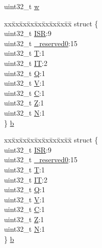 \begin{DoxyCompactItemize}
\begin{tabbing}
\end{tabbing}\item 
uint32\+\_\+t \hyperlink{unionx_p_s_r___type_ad0fb62e7a08e70fc5e0a76b67809f84b}{w}
\item 
\begin{tabbing}
xx\=xx\=xx\=xx\=xx\=xx\=xx\=xx\=xx\=\kill
struct \{\\
\>uint32\_t \hyperlink{unionx_p_s_r___type_ad502ba7dbb2aab5f87c782b28f02622d}{ISR}:9\\
\>uint32\_t \hyperlink{unionx_p_s_r___type_ac8a6a13838a897c8d0b8bc991bbaf7c1}{\_reserved0}:15\\
\>uint32\_t \hyperlink{unionx_p_s_r___type_a6e1cf12e53a20224f6f62c001d9be972}{T}:1\\
\>uint32\_t \hyperlink{unionx_p_s_r___type_a76485660fe8ad98cdc71ddd7cb0ed777}{IT}:2\\
\>uint32\_t \hyperlink{unionx_p_s_r___type_a65f27ddc4f7e09c14ce7c5211b2e000a}{Q}:1\\
\>uint32\_t \hyperlink{unionx_p_s_r___type_acd4a2b64faee91e4a9eef300667fa222}{V}:1\\
\>uint32\_t \hyperlink{unionx_p_s_r___type_a7a1caf92f32fe9ebd8d1fe89b06c7776}{C}:1\\
\>uint32\_t \hyperlink{unionx_p_s_r___type_a5ae954cbd9986cd64625d7fa00943c8e}{Z}:1\\
\>uint32\_t \hyperlink{unionx_p_s_r___type_abae0610bc2a97bbf7f689e953e0b451f}{N}:1\\
\} \hyperlink{unionx_p_s_r___type_a5fe7b3d4251f5516a5cc744f416a600a}{b}\\

\end{tabbing}\item 
\begin{tabbing}
xx\=xx\=xx\=xx\=xx\=xx\=xx\=xx\=xx\=\kill
struct \{\\
\>uint32\_t \hyperlink{unionx_p_s_r___type_ad502ba7dbb2aab5f87c782b28f02622d}{ISR}:9\\
\>uint32\_t \hyperlink{unionx_p_s_r___type_ac8a6a13838a897c8d0b8bc991bbaf7c1}{\_reserved0}:15\\
\>uint32\_t \hyperlink{unionx_p_s_r___type_a6e1cf12e53a20224f6f62c001d9be972}{T}:1\\
\>uint32\_t \hyperlink{unionx_p_s_r___type_a76485660fe8ad98cdc71ddd7cb0ed777}{IT}:2\\
\>uint32\_t \hyperlink{unionx_p_s_r___type_a65f27ddc4f7e09c14ce7c5211b2e000a}{Q}:1\\
\>uint32\_t \hyperlink{unionx_p_s_r___type_acd4a2b64faee91e4a9eef300667fa222}{V}:1\\
\>uint32\_t \hyperlink{unionx_p_s_r___type_a7a1caf92f32fe9ebd8d1fe89b06c7776}{C}:1\\
\>uint32\_t \hyperlink{unionx_p_s_r___type_a5ae954cbd9986cd64625d7fa00943c8e}{Z}:1\\
\>uint32\_t \hyperlink{unionx_p_s_r___type_abae0610bc2a97bbf7f689e953e0b451f}{N}:1\\
\} \hyperlink{unionx_p_s_r___type_ac2a9a795ab2663b586a1a69f90b3354d}{b}\\


\end{tabbing}
\end{DoxyCompactItemize}
